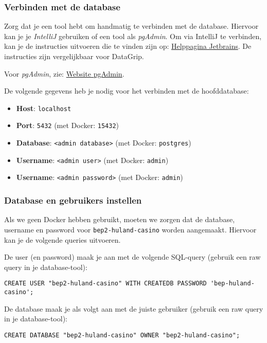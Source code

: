 \subsubsection{Verbinden met de database}
Zorg dat je een tool hebt om handmatig te verbinden met de database.
Hiervoor kan je je \textit{IntelliJ} gebruiken of een tool als \textit{pgAdmin}.
Om via IntelliJ te verbinden, kan je de instructies uitvoeren die te vinden zijn op:
\href{https://www.jetbrains.com/help/idea/connecting-to-a-database.html#connect-to-postgresql-database}{Helppagina Jetbrains}.
De instructies zijn vergelijkbaar voor DataGrip.

Voor \textit{pgAdmin}, zie: \href{https://www.pgadmin.org/}{Website pgAdmin}.

De volgende gegevens heb je nodig voor het verbinden met de hoofddatabase:
\begin{itemize}
    \item \textbf{Host}: \texttt{localhost}
    \item \textbf{Port}: \texttt{5432} (met Docker: \texttt{15432})
    \item \textbf{Database}: \texttt{<admin database>} (met Docker: \texttt{postgres})
    \item \textbf{Username}: \texttt{<admin user>} (met Docker: \texttt{admin})
    \item \textbf{Username}: \texttt{<admin password>} (met Docker: \texttt{admin})
\end{itemize}

\subsubsection{Database en gebruikers instellen}
Als we geen Docker hebben gebruikt, moeten we zorgen dat de database, username en password voor \texttt{bep2-huland-casino}
worden aangemaakt. Hiervoor kan je de volgende queries uitvoeren.

De user (en password) maak je aan met de volgende SQL-query (gebruik een raw query in je database-tool):
\begin{verbatim}
CREATE USER "bep2-huland-casino" WITH CREATEDB PASSWORD 'bep-huland-casino';
\end{verbatim}

De database maak je als volgt aan met de juiste gebruiker (gebruik een raw query in je database-tool): 
\begin{verbatim}
CREATE DATABASE "bep2-huland-casino" OWNER "bep2-huland-casino";
\end{verbatim}

